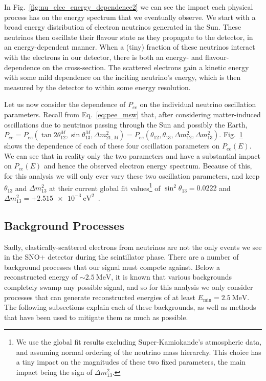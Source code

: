 In Fig.~\ref{fig:nu_elec_energy_dependence2} we can see the impact each physical process has on the energy spectrum that we eventually observe. We start with a broad energy distribution of \beight{} electron neutrinos generated in the Sun. These neutrinos then oscillate their flavour state as they propagate to the detector, in an energy-dependent manner. When a (tiny) fraction of these neutrinos interact with the electrons in our detector, there is both an energy- and flavour-dependence on the cross-section. The scattered electrons gain a kinetic energy with some mild dependence on the inciting neutrino's energy, which is then measured by the detector to within some energy resolution.

Let us now consider the dependence of $P_{ee}$ on the individual neutrino oscillation parameters. Recall from Eq.~\ref{eq:pee_msw} %
that, after considering matter-induced oscillations due to neutrinos passing through the Sun and possibly the Earth, $P_{ee} = P_{ee}\left(\tan2\theta^{M}_{12}, \sin\theta^{M}_{13}, \Delta m^{2}_{21,M}\right) = P_{ee}\left(\theta_{12}, \theta_{13}, \Delta m^{2}_{12}, \Delta m^{2}_{13}\right)$. Fig.~\ref{fig:pee_osc_param_dependence} shows the dependence of each of these four oscillation parameters on $P_{ee}(E)$. We can see that in reality only the two parameters \dmsq{} and \tonetwo{} have a substantial impact on $P_{ee}(E)$ and hence the observed electron energy spectrum. Because of this, for this analysis we will only ever vary these two oscillation parameters, and keep $\theta_{13}$ and $\Delta m^{2}_{13}$ at their current global fit values\footnote{We use the global fit results excluding Super-Kamiokande's atmospheric data, and assuming normal ordering of the neutrino mass hierarchy. This choice has a tiny impact on the magnitudes of these two fixed parameters, the main impact being the sign of $\Delta m^{2}_{13}$.} %
of $\sin^{2}\theta_{13} = 0.0222$ and $\Delta m^{2}_{13} = +\SI{2.515e-3}{\eV\squared}$~\cite{estebanFateHintsUpdated2020}.%

\begin{figure}
    \centering
    \caption[]{}
    \label{fig:pee_osc_param_dependence}
\end{figure}

\subsection{Background Processes}\label{sec:background_processes}
Sadly, elastically-scattered electrons from \beight{} neutrinos are not the only events we see in the SNO+ detector during the scintillator phase. There are a number of background processes that our signal must compete against. Below a reconstructed energy of $\sim\SI{2.5}{\MeV}$, it is known that various backgrounds completely swamp any possible \beight{} signal, and so for this analysis we only consider processes that can generate reconstructed energies of at least $E_{\textrm{min}} = \SI{2.5}{\MeV}$. The following subsections explain each of these backgrounds, as well as methods that have been used to mitigate them as much as possible.

